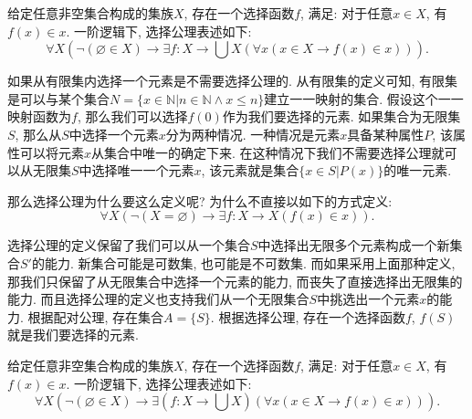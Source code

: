 \begin{axiom}[选择公理]
	给定任意非空集合构成的集族$X$, 存在一个选择函数$f$, 满足: 对于任意$x\in X$, 有$f(x)\in x$. 一阶逻辑下, 选择公理表述如下:
	\begin{equation}
		\forall X(\neg(\varnothing\in X)\rightarrow \exists f\colon X\rightarrow \bigcup X(\forall x(x\in X\rightarrow f(x)\in x))).
	\end{equation}
\end{axiom}

如果从有限集内选择一个元素是不需要选择公理的. 从有限集的定义可知, 有限集是可以与某个集合$N=\{x\in \mathbb{N}|n\in \mathbb{N}\wedge x\leqslant n\}$建立一一映射的集合. 假设这个一一映射函数为$f$, 那么我们可以选择$f(0)$作为我们要选择的元素. 如果集合为无限集$S$, 那么从$S$中选择一个元素$x$分为两种情况. 一种情况是元素$x$具备某种属性$P$, 该属性可以将元素$x$从集合中唯一的确定下来. 在这种情况下我们不需要选择公理就可以从无限集$S$中选择唯一一个元素$x$, 该元素就是集合$\{x\in S|P(x)\}$的唯一元素.

那么选择公理为什么要这么定义呢? 为什么不直接以如下的方式定义:
\[
\forall X(\neg(X=\varnothing)\rightarrow \exists f\colon X\rightarrow X(f(x)\in x)).
\]

选择公理的定义保留了我们可以从一个集合$S$中选择出无限多个元素构成一个新集合$S'$的能力. 新集合可能是可数集, 也可能是不可数集. 而如果采用上面那种定义, 那我们只保留了从无限集合中选择一个元素的能力, 而丧失了直接选择出无限集的能力. 而且选择公理的定义也支持我们从一个无限集合$S$中挑选出一个元素$x$的能力. 根据配对公理, 存在集合$A=\{S\}$. 根据选择公理, 存在一个选择函数$f$, $f(S)$就是我们要选择的元素.

\begin{axiom}[依赖选择公理]
	给定任意非空集合构成的集族$X$, 存在一个选择函数$f$, 满足: 对于任意$x\in X$, 有$f(x)\in x$. 一阶逻辑下, 选择公理表述如下:
	\begin{equation}
		\forall X(\neg(\varnothing\in X)\rightarrow \exists (f\colon X\rightarrow \bigcup X)(\forall x(x\in X\rightarrow f(x)\in x))).
	\end{equation}
\end{axiom}
